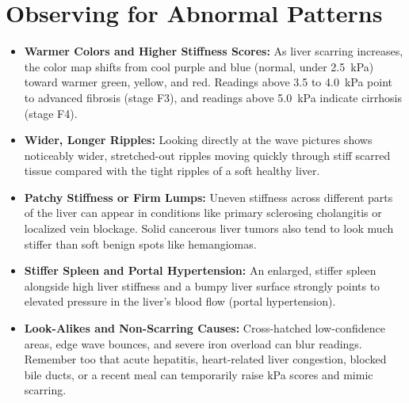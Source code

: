 \section{Observing for Abnormal Patterns}
\begin{itemize}
\item \textbf{Warmer Colors and Higher Stiffness Scores:} As liver scarring increases, the color map shifts from cool purple and blue (normal, under 2.5~kPa) toward warmer green, yellow, and red. Readings above 3.5 to 4.0~kPa point to advanced fibrosis (stage F3), and readings above 5.0~kPa indicate cirrhosis (stage F4).
\item \textbf{Wider, Longer Ripples:} Looking directly at the wave pictures shows noticeably wider, stretched-out ripples moving quickly through stiff scarred tissue compared with the tight ripples of a soft healthy liver.
\item \textbf{Patchy Stiffness or Firm Lumps:} Uneven stiffness across different parts of the liver can appear in conditions like primary sclerosing cholangitis or localized vein blockage. Solid cancerous liver tumors also tend to look much stiffer than soft benign spots like hemangiomas.
\item \textbf{Stiffer Spleen and Portal Hypertension:} An enlarged, stiffer spleen alongside high liver stiffness and a bumpy liver surface strongly points to elevated pressure in the liver's blood flow (portal hypertension).
\item \textbf{Look-Alikes and Non-Scarring Causes:} Cross-hatched low-confidence areas, edge wave bounces, and severe iron overload can blur readings. Remember too that acute hepatitis, heart-related liver congestion, blocked bile ducts, or a recent meal can temporarily raise kPa scores and mimic scarring.
\end{itemize}

